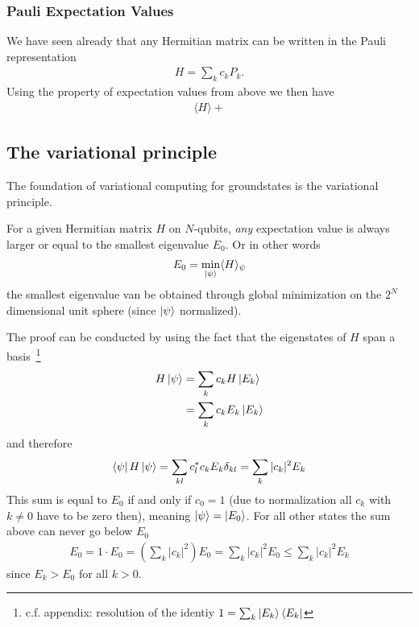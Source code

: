 \subsubsection*{Pauli Expectation Values}
We have seen already that any Hermitian matrix can be written in the Pauli representation 
\begin{align}
    H = \sum_{k} c_k P_k.
\end{align}
Using the property of expectation values from above we then have
\begin{align}
    \langle H \rangle + 
\end{align}



\subsection{The variational principle}
The foundation of variational computing for groundstates is the variational principle.
\begin{theorem*}
For a given Hermitian matrix $H$ on $N$-qubits, \textit{any} expectation value is always larger or equal to the smallest eigenvalue $E_0$. Or in other words
\begin{align}
    E_0 = \min_{\ket{\psi}} \langle H \rangle_{\psi}
\end{align}    
the smallest eigenvalue van be obtained through global minimization on the $2^N$ dimensional unit sphere (since $\ket{\psi}$ normalized).
\end{theorem*}
The proof can be conducted by using the fact that the eigenstates of $H$ span a basis~\footnote{c.f. appendix: resolution of the identiy $1 = \sum_k \ket{E_k}\bra{E_k}$} 
\begin{align}
    H \ket{\psi} &= \sum_k c_k H\ket{E_k} \\
    &= \sum_k c_k E_k \ket{E_k}
\end{align}
and therefore
\begin{align}
    \bra{\psi}H\ket{\psi} = \sum_{kl} c^*_l c_k E_k \delta_{kl} = \sum_{k} |c_k|^2 E_k 
\end{align}
This sum is equal to $E_0$ if and only if $c_0=1$ (due to normalization all $c_k$ with $k\neq0$ have to be zero then), meaning $\ket{\psi}=\ket{E_0}$. For all other states the sum above can never go below $E_0$
\begin{align}
    E_0 = 1\cdot E_0 =   \left(\sum_k |c_k|^2 \right) E_0 = \sum_{k} |c_k|^2 E_0 \leq \sum_{k} |c_k|^2 E_k
\end{align}
since $E_k > E_0$ for all $k>0$.

